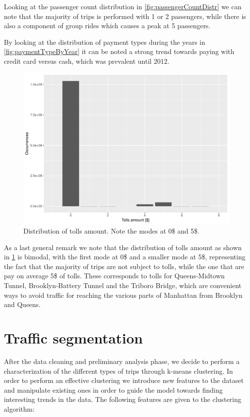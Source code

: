 \documentclass{acm_proc_article-sp-sigmod09}
\begin{document}
Looking at the passenger count distribution in \cref{fig:passengerCountDistr} we can note that the majority of trips is performed with 1 or 2 passengers, while there is also a component of group rides which causes a peak at 5 passengers.

By looking at the distribution of payment types during the years in \cref{fig:paymentTypeByYear} it can be noted a strong trend towards paying with credit card versus cash, which was prevalent until 2012.

\begin{figure}
	\centering
	\includegraphics[width=1\columnwidth]{resources/base_plots/tolls_amount_distr.pdf}
	\caption{Distribution of tolls amount. Note the modes at 0\$ and 5\$.}
	\label{fig:tollsAmountDistr}
\end{figure}

As a last general remark we note that the distribution of tolls amount as shown in \cref{fig:tollsAmountDistr} is bimodal, with the first mode at 0\$ and a smaller mode at 5\$, representing the fact that the majority of trips are not subject to tolls, while the one that are pay on average 5\$ of tolls. These corresponds to tolls for Queens-Midtown Tunnel, Brooklyn-Battery Tunnel and the Triboro Bridge, which are convenient ways to avoid traffic for reaching the various parts of Manhattan from Brooklyn and Queens.

\section{Traffic segmentation}

After the data cleaning and preliminary analysis phase, we decide to perform a characterization of the different types of trips through k-means clustering. In order to perform an effective clustering we introduce new features to the dataset and manipulate existing ones in order to guide the model towards finding interesting trends in the data. The following features are given to the clustering algorithm:
\end{document}
